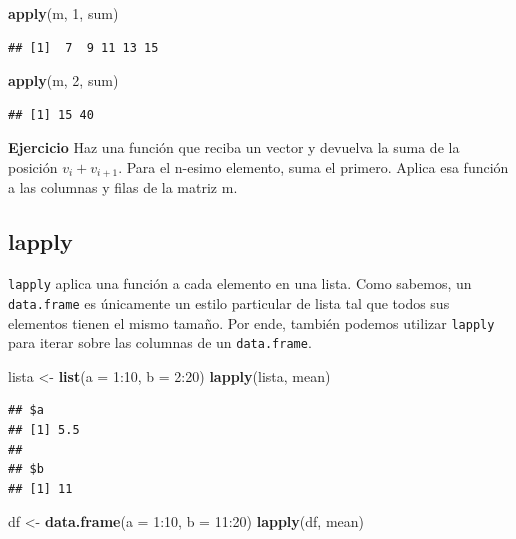 \documentclass[]{article}
\newenvironment{Shaded}{\begin{snugshade}}{\end{snugshade}}
\newcommand{\KeywordTok}[1]{\textcolor[rgb]{0.13,0.29,0.53}{\textbf{{#1}}}}
\newcommand{\DataTypeTok}[1]{\textcolor[rgb]{0.13,0.29,0.53}{{#1}}}
\newcommand{\DecValTok}[1]{\textcolor[rgb]{0.00,0.00,0.81}{{#1}}}
\newcommand{\StringTok}[1]{\textcolor[rgb]{0.31,0.60,0.02}{{#1}}}
\newcommand{\NormalTok}[1]{{#1}}
\begin{document}
\begin{Shaded}
\begin{Highlighting}[]
\KeywordTok{apply}\NormalTok{(m, }\DecValTok{1}\NormalTok{, sum)}
\end{Highlighting}
\end{Shaded}

\begin{verbatim}
## [1]  7  9 11 13 15
\end{verbatim}

\begin{Shaded}
\begin{Highlighting}[]
\KeywordTok{apply}\NormalTok{(m, }\DecValTok{2}\NormalTok{, sum)}
\end{Highlighting}
\end{Shaded}

\begin{verbatim}
## [1] 15 40
\end{verbatim}

\textbf{Ejercicio} Haz una función que reciba un vector y devuelva la
suma de la posición $v_i + v_{i + 1}$. Para el n-esimo elemento, suma el
primero. Aplica esa función a las columnas y filas de la matriz m.

\subsection{lapply}\label{lapply}

\texttt{lapply} aplica una función a cada elemento en una lista. Como
sabemos, un \texttt{data.frame} es únicamente un estilo particular de
lista tal que todos sus elementos tienen el mismo tamaño. Por ende,
también podemos utilizar \texttt{lapply} para iterar sobre las columnas
de un \texttt{data.frame}.

\begin{Shaded}
\begin{Highlighting}[]
\NormalTok{lista <-}\StringTok{ }\KeywordTok{list}\NormalTok{(}\DataTypeTok{a =} \DecValTok{1}\NormalTok{:}\DecValTok{10}\NormalTok{, }\DataTypeTok{b =} \DecValTok{2}\NormalTok{:}\DecValTok{20}\NormalTok{)}
\KeywordTok{lapply}\NormalTok{(lista, mean)}
\end{Highlighting}
\end{Shaded}

\begin{verbatim}
## $a
## [1] 5.5
## 
## $b
## [1] 11
\end{verbatim}

\begin{Shaded}
\begin{Highlighting}[]
\NormalTok{df <-}\StringTok{ }\KeywordTok{data.frame}\NormalTok{(}\DataTypeTok{a =} \DecValTok{1}\NormalTok{:}\DecValTok{10}\NormalTok{, }\DataTypeTok{b =} \DecValTok{11}\NormalTok{:}\DecValTok{20}\NormalTok{)}
\KeywordTok{lapply}\NormalTok{(df, mean)}
\end{Highlighting}
\end{Shaded}
\end{document}
